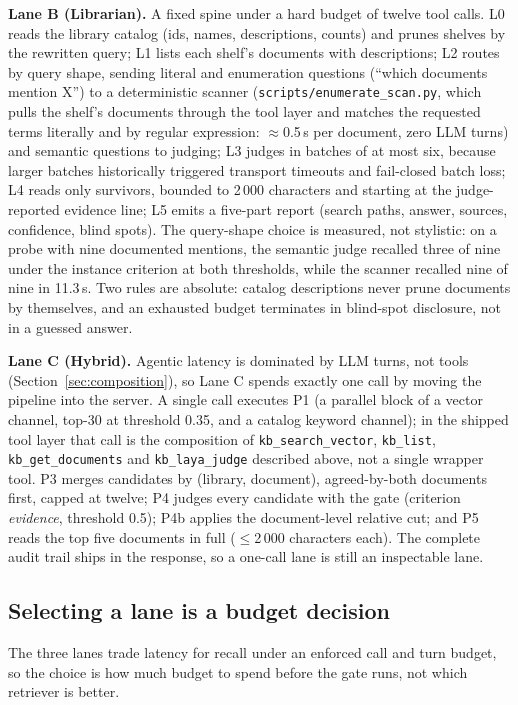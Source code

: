 \textbf{Lane B (Librarian).} A fixed spine under a hard budget of twelve tool
calls. L0 reads the library catalog (ids, names, descriptions, counts) and prunes
shelves by the rewritten query; L1 lists each shelf's documents with
descriptions; L2 routes by query shape, sending literal and enumeration questions
(``which documents mention X'') to a deterministic scanner
(\texttt{scripts/enumerate\_scan.py}, which pulls the shelf's documents through
the tool layer and matches the requested terms literally and by regular
expression: $\approx$0.5\,s per document, zero LLM turns) and semantic questions
to judging; L3 judges in batches of at most six,
because larger batches historically triggered transport timeouts
and fail-closed batch loss; L4 reads only survivors, bounded to 2\,000 characters
and starting at the judge-reported evidence line; L5 emits a five-part report
(search paths, answer, sources, confidence, blind spots). The query-shape
choice is measured, not stylistic: on a probe with nine documented mentions, the
semantic judge recalled three of nine under the instance criterion at both
thresholds, while the scanner recalled nine of nine in 11.3\,s. Two rules are absolute:
catalog descriptions never prune documents by themselves, and an exhausted budget
terminates in blind-spot disclosure, not in a guessed answer.

\textbf{Lane C (Hybrid).} Agentic latency is dominated by LLM turns, not tools
(Section~\ref{sec:composition}), so Lane C spends exactly one call by moving the
pipeline into the server. A single call executes P1 (a
parallel block of a vector channel, top-30 at threshold 0.35, and a catalog
keyword channel); in the shipped tool layer that call is the composition of
\texttt{kb\_search\_vector}, \texttt{kb\_list}, \texttt{kb\_get\_documents} and
\texttt{kb\_laya\_judge} described above, not a single wrapper tool. P3 merges
candidates by (library, document), agreed-by-both
documents first, capped at twelve; P4 judges every candidate with the gate
(criterion \emph{evidence}, threshold 0.5); P4b applies the document-level
relative cut; and P5 reads the top five documents in full ($\leq$2\,000
characters each). The complete audit trail ships in the response, so a one-call
lane is still an inspectable lane.

\subsection{Selecting a lane is a budget decision}

The three lanes trade latency for recall under an enforced call and turn budget,
so the choice is how much budget to spend before the gate runs, not which
retriever is better.

